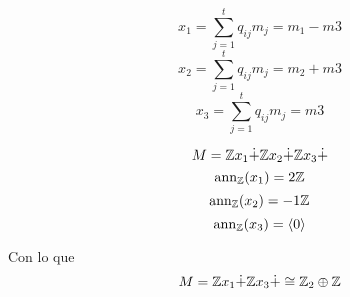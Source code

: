 \[
  x_1=\sum_{j=1}^t q_{ij}m_j=m_1-m3
\]
\[
  x_2=\sum_{j=1}^t q_{ij}m_j=m_2+m3
\]
\[
  x_3=\sum_{j=1}^t q_{ij}m_j=m3
\]

\[M=\mathbb{Z} x_1\dot{+}\mathbb{Z} x_2\dot{+}\mathbb{Z} x_3\dot{+}\]
\[
  \operatorname{ann}_{\mathbb{Z}}(x_1)=2\mathbb{Z}
\]
\[
  \operatorname{ann}_{\mathbb{Z}}(x_2)=-1\mathbb{Z}
\]
\[
  \operatorname{ann}_{\mathbb{Z}}(x_3)=\langle 0\rangle
\]

Con lo que
\[M=\mathbb{Z} x_1\dot{+}\mathbb{Z} x_3\dot{+}\cong\mathbb{Z}_2\oplus\mathbb{Z}\]
